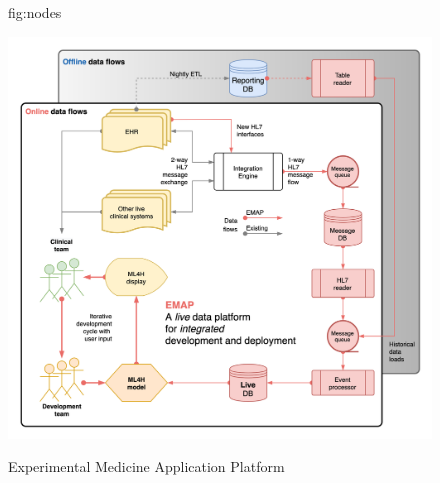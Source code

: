 \documentclass[pmlr,twocolumn,10pt]{jmlr} %
\begin{document}
\begin{figure}[htbp]
\floatconts
  {fig:nodes}
  {\caption{Experimental Medicine Application Platform}}
  {\includegraphics[width=1.0\linewidth]{images/emap-summary-Page-1.png}}
\end{figure}
\end{document}
